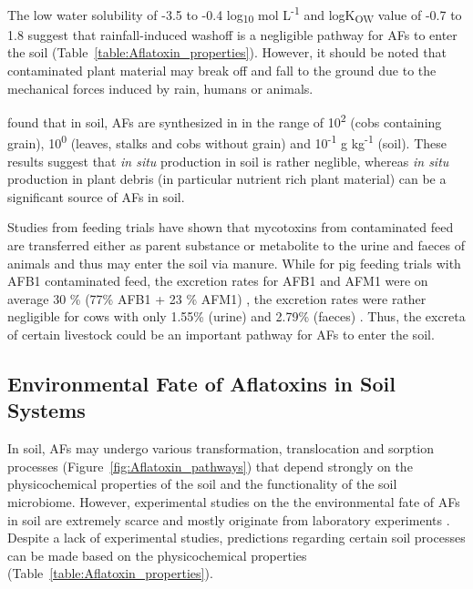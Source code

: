 The low water solubility of -3.5 to -0.4 log\textsubscript{10} mol L\textsuperscript{-1} and logK\textsubscript{OW} value of -0.7 to 1.8 suggest that  rainfall-induced washoff is a negligible pathway for AFs to enter the soil (Table~\ref{table:Aflatoxin_properties}). However, it should be noted that contaminated plant material may break off and fall to the ground due to the mechanical forces induced by rain, humans or animals. 


\citet{accinelli2008aspergillus} found that in soil, AFs are synthesized in in the range of 10\textsuperscript{2} (cobs containing grain), 10\textsuperscript{0} (leaves, stalks and cobs without grain) and 10\textsuperscript{-1} \textmu g kg\textsuperscript{-1} (soil). These results suggest that \textit{in situ} production in soil is rather neglible, whereas \textit{in situ} production in plant debris (in particular nutrient rich plant material) can be a significant source of AFs in soil. 

Studies from feeding trials have shown that mycotoxins from contaminated feed are transferred either as parent substance or metabolite to the urine and faeces of animals \citep{elmholt2008mycotoxins} and thus may enter the soil via manure. While for pig feeding trials with AFB1 contaminated feed, the excretion rates for AFB1 and AFM1 were on average 30 \% (77\% AFB1 + 23 \% AFM1) \citep{thieu2009zearalenone}, the excretion rates were rather negligible for cows with only 1.55\% (urine) and 2.79\% (faeces) \citep{allcroft1968excretion}. Thus, the excreta of certain livestock could be an important pathway for AFs to enter the soil.

\hfill

 

\subsection{Environmental Fate of Aflatoxins in Soil Systems} \label{subchap:dissipation}

In soil, AFs may undergo various transformation, translocation and sorption processes (Figure~\ref{fig:Aflatoxin_pathways}) that depend strongly on the physicochemical properties of the soil and the functionality of the soil microbiome. However, experimental studies on the the environmental fate of AFs in soil are extremely scarce and mostly originate from laboratory experiments \citep{elmholt2008mycotoxins}. Despite a lack of experimental studies, predictions regarding certain soil processes can be made based on the physicochemical properties (Table~\ref{table:Aflatoxin_properties}). 

